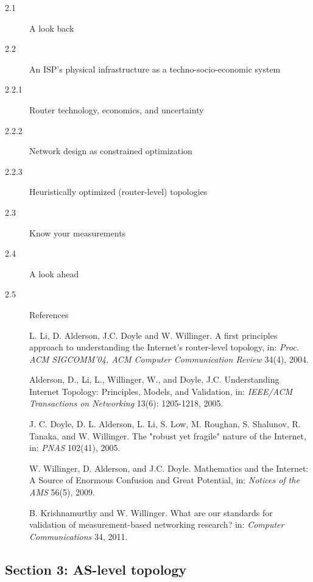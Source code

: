 \documentclass{sig-alternate-10pt}
\begin{document}
\begin{description}
\item[2.1] A look back
\item[2.2] An ISP's physical infrastructure as a techno-socio-economic system
\item[2.2.1] Router technology, economics, and uncertainty
\item[2.2.2] Network design as constrained optimization
\item[2.2.3] Heuristically optimized (router-level) topologies
\item[2.3] Know your measurements
\item[2.4] A look ahead
\item[2.5] References
\item[ ] L. Li, D. Alderson, J.C. Doyle and W. Willinger.
A first principles approach to understanding the Internet's router-level topology, in: {\em Proc. ACM SIGCOMM'04, ACM Computer Communication Review} 34(4), 2004.
\item[ ] Alderson, D., Li, L., Willinger, W., and Doyle, J.C. Understanding Internet Topology: Principles, Models, and Validation, in: {\em IEEE/ACM Transactions on Networking} 13(6): 1205-1218, 2005.
\item[ ] J. C. Doyle, D. L. Alderson, L. Li, S. Low, M. Roughan, S. Shalunov, R. Tanaka, and W. Willinger. The "robust yet fragile" nature of the Internet, in: {\em PNAS} 102(41), 2005.
\item[ ] W. Willinger, D. Alderson, and J.C. Doyle. Mathematics and the Internet: A Source of Enormous Confusion and Great Potential, in: {\em Notices of the AMS} 56(5), 2009.
\item[ ] B. Krishnamurthy and W. Willinger. What are our standards for validation of measurement-based networking research? in: {\em Computer Communications} 34, 2011.
\end{description}

\subsection*{Section 3: AS-level topology}
\end{document}
